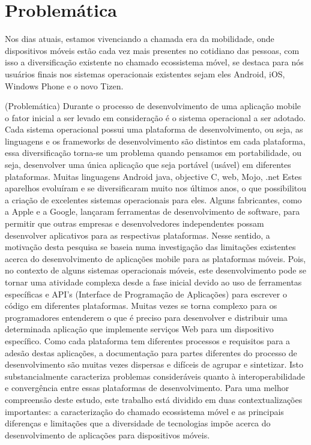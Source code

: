 \section{Problemática} %
\label{sec:motiva_o}

Nos dias atuais, estamos vivenciando a chamada era da mobilidade, onde
dispositivos móveis estão cada vez mais presentes no cotidiano das pessoas, com
isso a diversificação existente no chamado ecossistema móvel, se destaca para
nós usuários finais nos sistemas operacionais existentes sejam eles Android,
iOS, Windows Phone e o novo Tizen.

(Problemática) Durante o processo de desenvolvimento de uma aplicação mobile o
fator inicial a ser levado em consideração é o sistema operacional a ser adotado.
Cada sistema operacional possui uma plataforma de desenvolvimento, ou seja, as
linguagens e os frameworks de desenvolvimento são distintos em cada plataforma,
essa diversificação torna-se um problema quando pensamos em portabilidade,
ou seja, desenvolver uma única aplicação que seja portável (usável) em
diferentes plataformas.
Muitas linguagens Android java, objective C, web, Mojo, .net
Estes aparelhos evoluíram e se diversificaram muito nos últimos anos, o que possibilitou a criação de
excelentes sistemas operacionais para eles. Alguns fabricantes, como a Apple e a Google, lançaram
ferramentas de desenvolvimento de software, para permitir que outras empresas e desenvolvedores
independentes possam desenvolver aplicativos para as respectivas plataformas.
Nesse sentido, a motivação desta pesquisa se baseia numa investigação das limitações existentes
acerca do desenvolvimento de aplicações mobile para as plataformas móveis. Pois, no contexto de alguns
sistemas operacionais móveis, este desenvolvimento pode se tornar uma atividade complexa desde a fase
inicial devido ao uso de ferramentas específicas e API’s (Interface de Programação de Aplicações) para
escrever o código em diferentes plataformas. Muitas vezes se torna complexo para os programadores
entenderem o que é preciso para desenvolver e distribuir uma determinada aplicação que implemente
serviços Web para um dispositivo específico. Como cada plataforma tem diferentes processos e requisitos
para a adesão destas aplicações, a documentação para partes diferentes do processo de desenvolvimento são
muitas vezes dispersas e difíceis de agrupar e sintetizar. Isto substancialmente caracteriza problemas
consideráveis quanto à interoperabilidade e convergência entre essas plataformas de desenvolvimento. Para
uma melhor compreensão deste estudo, este trabalho está dividido em duas contextualizações importantes: a
caracterização do chamado ecossistema móvel e as principais diferenças e limitações que a diversidade de
tecnologias impõe acerca do desenvolvimento de aplicações para dispositivos móveis.

